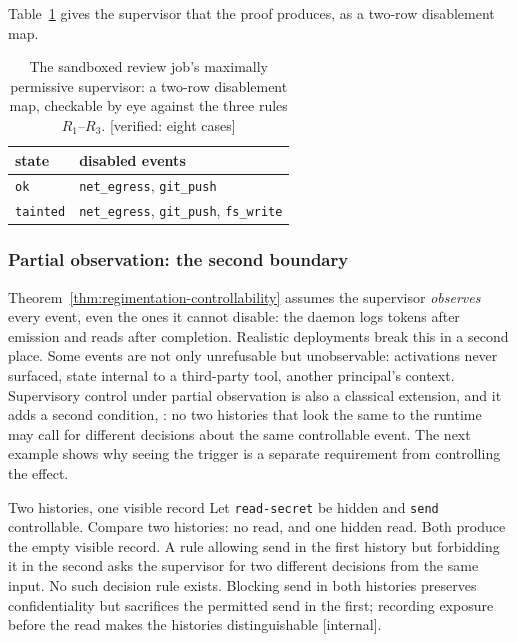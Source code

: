 \documentclass[11pt,a4paper]{article}
\theoremstyle{definition}
\theoremstyle{remark}
\begin{document}
Table~\ref{tab:swk-review-disablement} gives the supervisor that the proof
produces, as a two-row disablement map.

\begin{table}[H]
\centering
\caption{The sandboxed review job's maximally permissive supervisor: a
two-row disablement map, checkable by eye against the three rules $R_1$--$R_3$.
[verified: eight cases]}
\label{tab:swk-review-disablement}
\small
\renewcommand{\arraystretch}{1.2}
\begin{tabularx}{\textwidth}{@{}>{\raggedright\arraybackslash}p{} X@{}}
\toprule
\textbf{state} & \textbf{disabled events} \\
\midrule
\texttt{ok} & \texttt{net\_egress}, \texttt{git\_push} \\
\texttt{tainted} & \texttt{net\_egress}, \texttt{git\_push}, \texttt{fs\_write} \\
\bottomrule
\end{tabularx}
\end{table}

\subsubsection{Partial observation: the second boundary}
\label{sec:partial-observation}

Theorem~\ref{thm:regimentation-controllability} assumes the supervisor \emph{observes} every
event, even the ones it cannot disable: the daemon logs tokens after emission and reads after
completion. Realistic deployments break this in a second place. Some events are not only
unrefusable but unobservable: activations never surfaced, state internal to a third-party
tool, another principal's context. Supervisory control under partial observation is also
a classical extension, and it adds a second condition, : no two
histories that look the same to the runtime may call for different decisions about the
same controllable event. The next example shows why seeing the trigger is a separate
requirement from controlling the effect.

\begin{pdexample}{Two histories, one visible record}
Let \texttt{read-secret} be hidden and \texttt{send} controllable. Compare
two histories: no read, and one hidden read. Both produce the empty visible
record. A rule allowing send in the first history but forbidding it in the
second asks the supervisor for two different decisions from the same input.
No such decision rule exists. Blocking send in both histories preserves
confidentiality but sacrifices the permitted send in the first; recording
exposure before the read makes the histories distinguishable [internal].
\end{pdexample}
\end{document}
